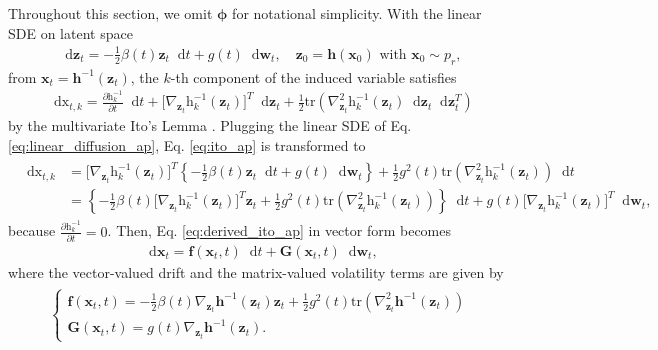 \documentclass{article}
\theoremstyle{definition}
\theoremstyle{remark}
\newcommand*\diff{\mathop{}\!\mathrm{d}}
\begin{document}
	Throughout this section, we omit $\bm{\phi}$ for notational simplicity. With the linear SDE on latent space
	\begin{align}\label{eq:linear_diffusion_ap}
	\diff\mathbf{z}_{t}=-\frac{1}{2}\beta(t)\mathbf{z}_{t}\diff t+g(t)\diff \mathbf{w}_{t},\quad\mathbf{z}_{0}=\mathbf{h}(\mathbf{x}_{0})\text{ with }\mathbf{x}_{0}\sim p_{r},
	\end{align}
	from $\mathbf{x}_{t}=\mathbf{h}^{-1}(\mathbf{z}_{t})$, the $k$-th component of the induced variable satisfies
	\begin{align}\label{eq:ito_ap}
	\diff \mathrm{x}_{t,k}= \frac{\partial \mathrm{h}_{k}^{-1}}{\partial t} \diff t + \big[\nabla_{\mathbf{z}_{t}}\mathrm{h}_{k}^{-1}(\mathbf{z}_{t})\big]^{T} \diff\mathbf{z}_{t}+ \frac{1}{2} \text{tr} \left ( \nabla_{\mathbf{z}_{t}}^{2} \mathrm{h}_{k}^{-1}(\mathbf{z}_{t})\diff\mathbf{z}_{t}\diff\mathbf{z}_{t}^{T}  \right )
	\end{align}
	by the multivariate Ito's Lemma \citep{oksendal2013stochastic}. Plugging the linear SDE of Eq. \eqref{eq:linear_diffusion_ap}, Eq. \eqref{eq:ito_ap} is transformed to
	\begin{align}\label{eq:derived_ito_ap}
	\begin{split}
	\diff\mathrm{x}_{t,k} &= \big[\nabla_{\mathbf{z}_t}\mathrm{h}_{k}^{-1}(\mathbf{z}_{t})\big]^{T} \left \{ -\frac{1}{2}\beta(t)\mathbf{z}_{t}\diff t+g(t)\diff \mathbf{w}_{t} \right \} + \frac{1}{2} g^{2}(t)\text{tr} \left ( \nabla_{\mathbf{z}_{t}}^{2} \mathrm{h}_{k}^{-1}(\mathbf{z}_{t})   \right )\diff t \\
	&= \left \{ -\frac{1}{2} \beta(t) \big[\nabla_{\mathbf{z}_{t}}\mathrm{h}_{k}^{-1}(\mathbf{z}_{t})\big]^{T}\mathbf{z}_{t} + \frac{1}{2} g^{2}(t) \text{tr} \left ( \nabla_{\mathbf{z}_{t}}^{2} \mathrm{h}_{k}^{-1}(\mathbf{z}_{t})    \right ) \right \} \diff t + g(t) \big[\nabla_{\mathbf{z}_t}\mathrm{h}_{k}^{-1}(\mathbf{z}_{t})\big]^{T} \diff \mathbf{w}_{t},
	\end{split}
	\end{align}
	because $\frac{\partial\mathrm{h}_{k}^{-1}}{\partial t}=0$. Then, Eq. \eqref{eq:derived_ito_ap} in vector form becomes
	\begin{align*}
	\diff\mathbf{x}_{t}=\mathbf{f}(\mathbf{x}_{t},t)\diff t+\mathbf{G}(\mathbf{x}_{t},t)\diff\mathbf{w}_{t},
	\end{align*}
	where the vector-valued drift and the matrix-valued volatility terms are given by
	\begin{align}\label{eq:drift_ap}
	\begin{split}
	\left\{\begin{array}{ll}
	\mathbf{f}(\mathbf{x}_{t},t)=-\frac{1}{2} \beta(t) \nabla_{\mathbf{z}_{t}}\mathbf{h}^{-1}(\mathbf{z}_{t}) \mathbf{z}_{t} + \frac{1}{2} g^{2}(t) \text{tr} \left ( \nabla_{\mathbf{z}_{t}}^{2} \mathbf{h}^{-1}(\mathbf{z}_{t})    \right )\\[0.05cm]
	\mathbf{G}(\mathbf{x}_{t},t)=g(t) \nabla_{\mathbf{z}_t}\mathbf{h}^{-1}(\mathbf{z}_{t}).
	\end{array}\right.
	\end{split}
	\end{align}
\end{document}
